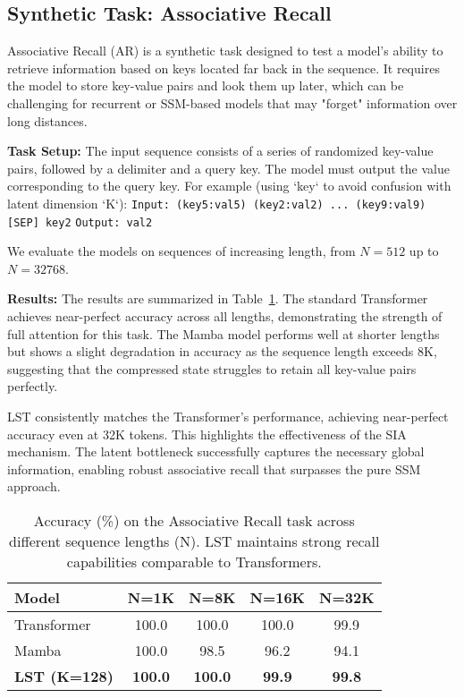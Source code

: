 \documentclass[10pt,twocolumn,letterpaper]{article}
\begin{document}
\subsection{Synthetic Task: Associative Recall}

Associative Recall (AR) is a synthetic task designed to test a model's ability to retrieve information based on keys located far back in the sequence. It requires the model to store key-value pairs and look them up later, which can be challenging for recurrent or SSM-based models that may "forget" information over long distances.

\textbf{Task Setup:} The input sequence consists of a series of randomized key-value pairs, followed by a delimiter and a query key. The model must output the value corresponding to the query key. For example (using `key` to avoid confusion with latent dimension `K`):
\texttt{Input: (key5:val5) (key2:val2) ... (key9:val9) [SEP] key2}
\texttt{Output: val2}

We evaluate the models on sequences of increasing length, from \(N=512\) up to \(N=32768\).

\textbf{Results:} The results are summarized in Table~\ref{tab:associative_recall}. The standard Transformer achieves near-perfect accuracy across all lengths, demonstrating the strength of full attention for this task. The Mamba model performs well at shorter lengths but shows a slight degradation in accuracy as the sequence length exceeds 8K, suggesting that the compressed state struggles to retain all key-value pairs perfectly.

LST consistently matches the Transformer's performance, achieving near-perfect accuracy even at 32K tokens. This highlights the effectiveness of the SIA mechanism. The latent bottleneck successfully captures the necessary global information, enabling robust associative recall that surpasses the pure SSM approach.

\begin{table}[t]
\centering
\small
\begin{tabular}{@{}lcccc@{}}
\toprule
\textbf{Model} & \textbf{N=1K} & \textbf{N=8K} & \textbf{N=16K} & \textbf{N=32K} \\
\midrule
Transformer & 100.0 & 100.0 & 100.0 & 99.9 \\
Mamba & 100.0 & 98.5 & 96.2 & 94.1 \\
\textbf{LST (K=128)} & \textbf{100.0} & \textbf{100.0} & \textbf{99.9} & \textbf{99.8} \\
\bottomrule
\end{tabular}
\caption{Accuracy (\%) on the Associative Recall task across different sequence lengths (N). LST maintains strong recall capabilities comparable to Transformers.}
\label{tab:associative_recall}
\end{table}
\end{document}
